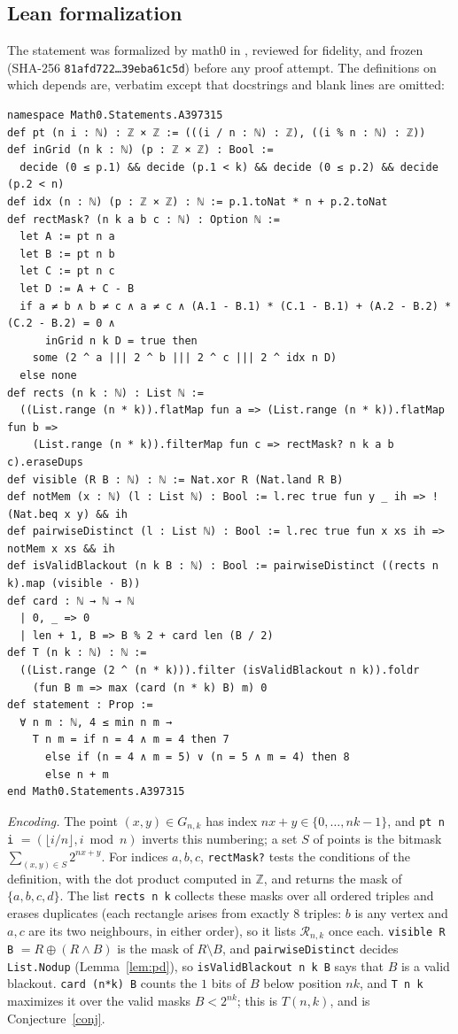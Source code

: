 \documentclass[11pt]{amsart}
\theoremstyle{plain}
\theoremstyle{definition}
\newcommand{\Z}{\mathbb{Z}}
\newcommand{\G}{G_{n,k}}
\newcommand{\Rc}{\mathcal{R}}
\begin{document}
\subsection*{Lean formalization}
The statement was formalized by math0 in , reviewed for fidelity, and frozen (SHA-256 \texttt{81afd722\ldots39eba61c5d}) before any proof attempt. The definitions on which  depends are, verbatim except that docstrings and blank lines are omitted:
\begin{lstlisting}
namespace Math0.Statements.A397315
def pt (n i : ℕ) : ℤ × ℤ := (((i / n : ℕ) : ℤ), ((i % n : ℕ) : ℤ))
def inGrid (n k : ℕ) (p : ℤ × ℤ) : Bool :=
  decide (0 ≤ p.1) && decide (p.1 < k) && decide (0 ≤ p.2) && decide (p.2 < n)
def idx (n : ℕ) (p : ℤ × ℤ) : ℕ := p.1.toNat * n + p.2.toNat
def rectMask? (n k a b c : ℕ) : Option ℕ :=
  let A := pt n a
  let B := pt n b
  let C := pt n c
  let D := A + C - B
  if a ≠ b ∧ b ≠ c ∧ a ≠ c ∧ (A.1 - B.1) * (C.1 - B.1) + (A.2 - B.2) * (C.2 - B.2) = 0 ∧
      inGrid n k D = true then
    some (2 ^ a ||| 2 ^ b ||| 2 ^ c ||| 2 ^ idx n D)
  else none
def rects (n k : ℕ) : List ℕ :=
  ((List.range (n * k)).flatMap fun a => (List.range (n * k)).flatMap fun b =>
    (List.range (n * k)).filterMap fun c => rectMask? n k a b c).eraseDups
def visible (R B : ℕ) : ℕ := Nat.xor R (Nat.land R B)
def notMem (x : ℕ) (l : List ℕ) : Bool := l.rec true fun y _ ih => !(Nat.beq x y) && ih
def pairwiseDistinct (l : List ℕ) : Bool := l.rec true fun x xs ih => notMem x xs && ih
def isValidBlackout (n k B : ℕ) : Bool := pairwiseDistinct ((rects n k).map (visible · B))
def card : ℕ → ℕ → ℕ
  | 0, _ => 0
  | len + 1, B => B % 2 + card len (B / 2)
def T (n k : ℕ) : ℕ :=
  ((List.range (2 ^ (n * k))).filter (isValidBlackout n k)).foldr
    (fun B m => max (card (n * k) B) m) 0
def statement : Prop :=
  ∀ n m : ℕ, 4 ≤ min n m →
    T n m = if n = 4 ∧ m = 4 then 7
      else if (n = 4 ∧ m = 5) ∨ (n = 5 ∧ m = 4) then 8
      else n + m
end Math0.Statements.A397315
\end{lstlisting}
\emph{Encoding.} The point $(x,y)\in\G$ has index $nx+y\in\{0,\dots,nk-1\}$, and \texttt{pt n i} $=(\lfloor i/n\rfloor, i\bmod n)$ inverts this numbering; a set $S$ of points is the bitmask $\sum_{(x,y)\in S}2^{nx+y}$. For indices $a,b,c$, \texttt{rectMask?} tests the conditions of the definition, with the dot product computed in $\Z$, and returns the mask of $\{a,b,c,d\}$. The list \texttt{rects n k} collects these masks over all ordered triples and erases duplicates (each rectangle arises from exactly $8$ triples: $b$ is any vertex and $a,c$ are its two neighbours, in either order), so it lists $\Rc_{n,k}$ once each. \texttt{visible R B} $=R\oplus(R\wedge B)$ is the mask of $R\setminus B$, and \texttt{pairwiseDistinct} decides \texttt{List.Nodup} (Lemma~\ref{lem:pd}), so \texttt{isValidBlackout n k B} says that $B$ is a valid blackout. \texttt{card (n*k) B} counts the $1$ bits of $B$ below position $nk$, and \texttt{T n k} maximizes it over the valid masks $B<2^{nk}$; this is $T(n,k)$, and  is Conjecture~\ref{conj}.
\end{document}

